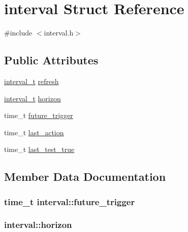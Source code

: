 \hypertarget{structinterval}{}\section{interval Struct Reference}
\label{structinterval}


{\ttfamily \#include $<$interval.\+h$>$}

\subsection*{Public Attributes}
\begin{DoxyCompactItemize}
\item 
\hyperlink{common_8h_a3d8621f960ada51a5ad9ff181730481a}{interval\+\_\+t} \hyperlink{structinterval_aaecafe7bd134ec05631da6d0ea390589}{refresh}
\item 
\hyperlink{common_8h_a3d8621f960ada51a5ad9ff181730481a}{interval\+\_\+t} \hyperlink{structinterval_a1e077a84fa1938b7a5c97323deab98da}{horizon}
\item 
time\+\_\+t \hyperlink{structinterval_a0b6f4c998b90affcf683651eaacad8bc}{future\+\_\+trigger}
\item 
time\+\_\+t \hyperlink{structinterval_a556ca763caea4f4f6c29a899e92e5208}{last\+\_\+action}
\item 
time\+\_\+t \hyperlink{structinterval_ad528832ae1d2456710993f56b76fdb26}{last\+\_\+test\+\_\+true}
\end{DoxyCompactItemize}


\subsection{Member Data Documentation}
\hypertarget{structinterval_a0b6f4c998b90affcf683651eaacad8bc}{}
\subsubsection[{future\+\_\+trigger}]{\setlength{\rightskip}{0pt plus 5cm}time\+\_\+t interval\+::future\+\_\+trigger}\label{structinterval_a0b6f4c998b90affcf683651eaacad8bc}
\hypertarget{structinterval_a1e077a84fa1938b7a5c97323deab98da}{}
\subsubsection[{horizon}]{ interval\+::horizon}\label{structinterval_a1e077a84fa1938b7a5c97323deab98da}
\hypertarget{structinterval_a556ca763caea4f4f6c29a899e92e5208}{}
